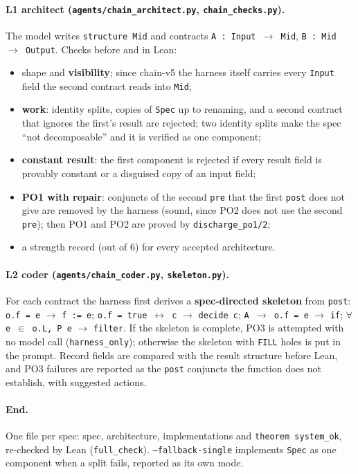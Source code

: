 \documentclass[11pt,a4paper]{article}
\newcommand{\code}[1]{\texttt{#1}}
\newcommand{\file}[1]{\texttt{#1}}
\begin{document}
\paragraph{L1 architect (\file{agents/chain\_architect.py}, \file{chain\_checks.py}).} The
model writes \code{structure Mid} and contracts \code{A : Input $\to$ Mid},
\code{B : Mid $\to$ Output}. Checks before and in Lean:
\begin{itemize}
  \item shape and \textbf{visibility}; since chain-v5 the harness itself carries every
        \code{Input} field the second contract reads into \code{Mid};
  \item \textbf{work}: identity splits, copies of \code{Spec} up to renaming, and a second
        contract that ignores the first's result are rejected; two identity splits make the
        spec ``not decomposable'' and it is verified as one component;
  \item \textbf{constant result}: the first component is rejected if every result field is
        provably constant or a disguised copy of an input field;
  \item \textbf{PO1 with repair}: conjuncts of the second \code{pre} that the first \code{post}
        does not give are removed by the harness (sound, since PO2 does not use the second
        \code{pre}); then PO1 and PO2 are proved by \code{discharge\_po1/2};
  \item a strength record (out of 6) for every accepted architecture.
\end{itemize}

\paragraph{L2 coder (\file{agents/chain\_coder.py}, \file{skeleton.py}).} For each contract the
harness first derives a \textbf{spec-directed skeleton} from \code{post}:
\code{o.f = e} $\to$ \code{f := e}; \code{o.f = true $\leftrightarrow$ c} $\to$ \code{decide c};
\code{A $\to$ o.f = e} $\to$ \code{if}; \code{$\forall$ e $\in$ o.L, P e} $\to$ \code{filter}.
If the skeleton is complete, PO3 is attempted with no model call (\code{harness\_only});
otherwise the skeleton with \code{FILL} holes is put in the prompt. Record fields are compared
with the result structure before Lean, and PO3 failures are reported as the \code{post}
conjuncts the function does not establish, with suggested actions.

\paragraph{End.} One file per spec: spec, architecture, implementations and
\code{theorem system\_ok}, re-checked by Lean (\code{full\_check}).
\code{--fallback-single} implements \code{Spec} as one component when a split fails, reported
as its own mode.
\end{document}
